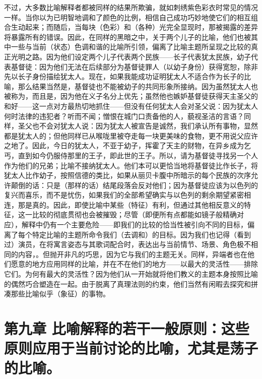 不过，大多数比喻解释者都被同样的结果所欺骗，就如刺绣紫色彩衣时常见的情况一样。当你以为已明智地调和了颜色的比例，相信自己成功巧妙地使它们的相互组合生动起来；而随后，当每块（色彩）和（各种）光完全显现时，那被揭露的差异将暴露所有的错误。因此，在同样的黑暗之中，关于两个儿子的比喻，他们也被其中一些与当前（状态）色调和谐的比喻所引领，偏离了比喻主题所呈现之比较的真正光明之路。因为他们设定两个儿子代表两个民族——长子代表犹太民族，幼子代表基督徒：因为他们无法在后续部分为基督徒罪人（以幼子身份）获得宽恕，除非先以长子身份描绘犹太人。现在，如果我能成功证明犹太人不适合作为长子的比喻，那么结果当然是，基督徒也不能被幼子的共同形象所接纳。因为虽然犹太人也被称为，而且是，因为他在义子名分上优先；虽然他也嫉妒基督徒获得天主圣父的和好——这一点对方最热切地抓住——但没有任何犹太人会对圣父说：因为犹太人何时法律的违犯者？听而不闻；憎恨在城门口责备他的人，藐视圣洁的言语？同样，圣父也不会对犹太人说：因为犹太人被宣告是诚然，我们承认所有事物，显然都是犹太人的；但他同样已从喉咙里被夺走每一块更美味的食物，更不用说父应许之地了。因此，今日的犹太人，不亚于幼子，挥霍了天主的财物，在异乡成为乞丐，直到如今仍服侍那里的王子，即此世的王子。所以，请为基督徒寻找另一个人作为他们的兄弟；比喻不接纳犹太人。他们本可以更恰当地将基督徒比作长子，将犹太人比作幼子，按照信德的类比，如果从丽贝卡腹中所暗示的每个民族的次序允许颠倒的话：只是（那样的话）结尾段落会反对他们；因为基督徒应该为以色列的复兴而喜乐，而不是忧伤，如果我们的全部希望确实与以色列的剩余期望紧密相连，那是真的。因此，即使比喻中某些（特征）有利，但通过其他相反意义的特征，这一比较的彻底贯彻也会被摧毁；尽管（即便所有点都能如镜子般精确对应），解释中仍有一个主要危险——即我们的比较的恰当性被引向不同的目标，偏离了每个特定比喻的主题所命令我们（去调和）的目标。因为我们也记得（看到过）演员，在将寓言姿态与其歌词配合时，表达出与当前情节、场景、角色极不相同的内容，。但抛开非凡的巧思，因为它与我们的主题无关。同样，异端者也在他们愿意的地方应用同样的比喻，并在不在他们的地方——以最大的灵活性——排除它们。为何有最大的灵活性？因为他们从一开始就将他们教义的主题本身按照比喻的偶然巧合塑造在一起。由于脱离了真理法则的约束，他们当然有闲暇去探究和拼凑那些比喻似乎（象征）的事物。\par


\section{第九章 比喻解释的若干一般原则：这些原则应用于当前讨论的比喻，尤其是荡子的比喻。}

